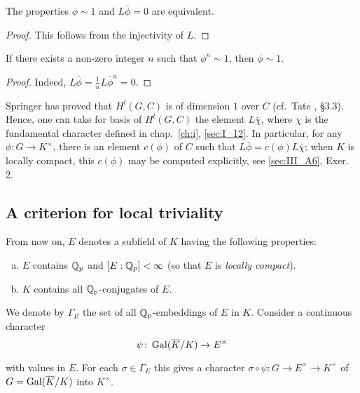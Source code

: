 \begin{subappendices}
\begin{prop}\label{prop:III_A2_3}
	The properties $\phi \sim 1$ and $L\bar{\phi} = 0$ are equivalent.
\end{prop}
\begin{proof}
This follows from the injectivity of $L$.
\end{proof}

\begin{cor}
If there exists a non-zero integer $n$ such that $\phi^n \sim 1$, then $\phi
\sim 1$.
\end{cor}
\begin{proof}
Indeed, $L\bar{\phi} = \frac{1}{n} L\bar{\phi}^n = 0$.
\end{proof}

\begin{obs}
Springer has proved that $H^l(G,C)$ is of dimension $1$ over $C$
 (cf.\ Tate \cite{39}, \S3.3). Hence,
one can take for basis of $H^l(G,C)$ the element $L\bar{\chi}$, where $\chi$ is
the fundamental character defined in chap.~\ref{ch:i}, \ref{sec:I_12}.
In particular, for any $\phi \colon G \to K^\times$, there is an element
$c(\phi)$ of $C$ such that $L\bar{\phi} = c(\phi)L\bar{\chi}$; when $K$ is
locally compact, this $c(\phi)$ may be computed explicitly, see
\ref{sec:III_A6}, Exer. 2.
\end{obs}

\subsection{A criterion for local triviality}
\label{sec:III_A3}

From now on, $E$ denotes a subfield of $K$ having the following properties: 
\begin{enumerate}[(a)]
\item $E$ contains $\mathbb{Q}_p$ and $[E : \mathbb{Q}_p] < \infty$ (so that $E$ is \emph{locally
compact}).
\item $K$ contains all $\mathbb{Q}_p$-conjugates of $E$.
\end{enumerate}

We denote by $\Gamma_E$ the set of all $\mathbb{Q}_p$-embeddings of $E$ in $K$. Consider
a continuous character
\[
	\psi \colon \operatorname{Gal}(\overline{K}/K) \rightarrow E^\times
\]

with values in $E$. For each $\sigma \in \Gamma_E$ this gives a character
$\sigma \circ \psi \colon G \to E^\times \to K^\times$ of $G =
\operatorname{Gal}(\overline{K}/K)$ into $K^\times$.


\end{subappendices}
